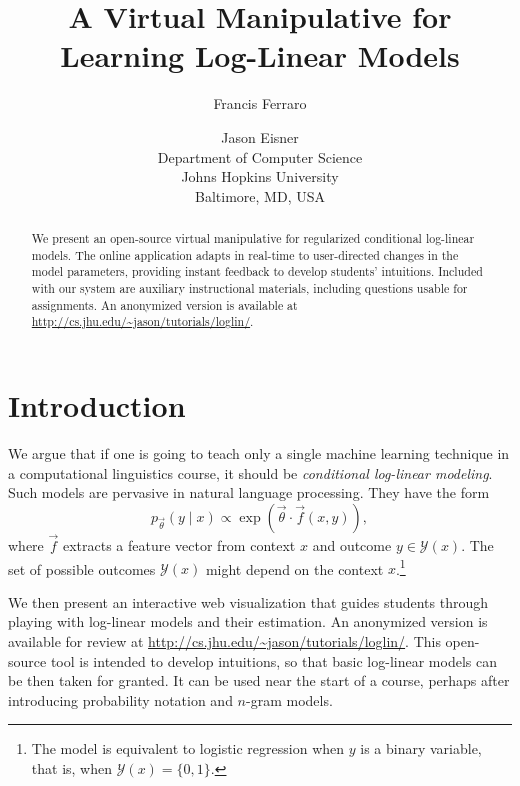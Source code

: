\documentclass[11pt,letterpaper]{article}
\title{A Virtual Manipulative for Learning Log-Linear Models}
\author{
Francis Ferraro \and Jason Eisner\\
Department of Computer Science\\
Johns Hopkins University\\
Baltimore, MD, USA
}
\date{}
\newcommand{\WhereToFind}[0]{\url{http://cs.jhu.edu/~jason/tutorials/loglin/}}
\begin{document}
\maketitle

\begin{abstract}
We present an open-source virtual manipulative for regularized conditional 
log-linear models. The online application adapts in real-time to user-directed 
changes in the model parameters, providing instant feedback to develop 
students' intuitions. Included with our system are auxiliary instructional materials, 
including questions usable for assignments. An anonymized version is available at
\WhereToFind{}.
\end{abstract}

\section{Introduction}\label{sec:intro}
We argue that if one is going to teach only a single machine learning
technique in a computational linguistics course, it should be {\em
  conditional log-linear modeling}.  Such models are pervasive in
natural language processing.  They have the form
\begin{equation}\label{eqn:loglin}
p_{\vec{\theta}}(y \mid x) \propto \exp{\left(\vec{\theta} \cdot \vec{f}\left(x,y\right)\right)},
\end{equation}
where $\vec{f}$ extracts a feature vector from context $x$ and
outcome $y \in \mathcal{Y}(x)$.  The set of possible
outcomes $\mathcal{Y}(x)$ might depend on the context
$x$.\footnote{The model is equivalent to logistic regression
  when $y$ is a binary variable, that is, when $\mathcal{Y}(x)=\{0,1\}$.}


We then present an interactive web visualization that guides students
through playing with log-linear models and their estimation. An
anonymized version is available for review at \WhereToFind{}.  This
open-source tool is intended to develop intuitions, so that basic
log-linear models can be then taken for granted.  It can be used near
the start of a course, perhaps after introducing probability notation
and $n$-gram models. 
\end{document}

